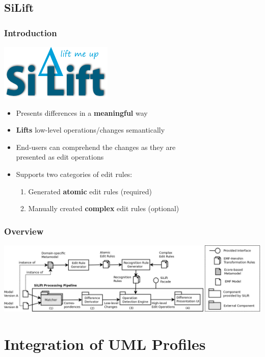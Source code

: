 \documentclass[10pt]{beamer}
\begin{document}
\subsection{SiLift}
\begin{frame}
\frametitle{Introduction}
\begin{center}
\includegraphics[scale=0.3]{siliftLogo}\\
\end{center}
\begin{itemize}
  \item Presents differences in a \textbf{meaningful} way
  \item \textbf{Lifts} low-level operations/changes semantically
  \item End-users can comprehend the changes as they are \\presented as edit operations
  \item Supports two categories of edit rules:
   \begin{enumerate}
    \item Generated \textbf{atomic} edit rules (required)
    \item Manually created \textbf{complex} edit rules (optional)
  \end{enumerate}
\end{itemize}
\end{frame}
\begin{frame}
\frametitle{Overview}
\begin{center}
\includegraphics[scale=0.19]{siliftworkflow}\\
\end{center}
\end{frame}
\section{Integration of UML Profiles}
\end{document}
